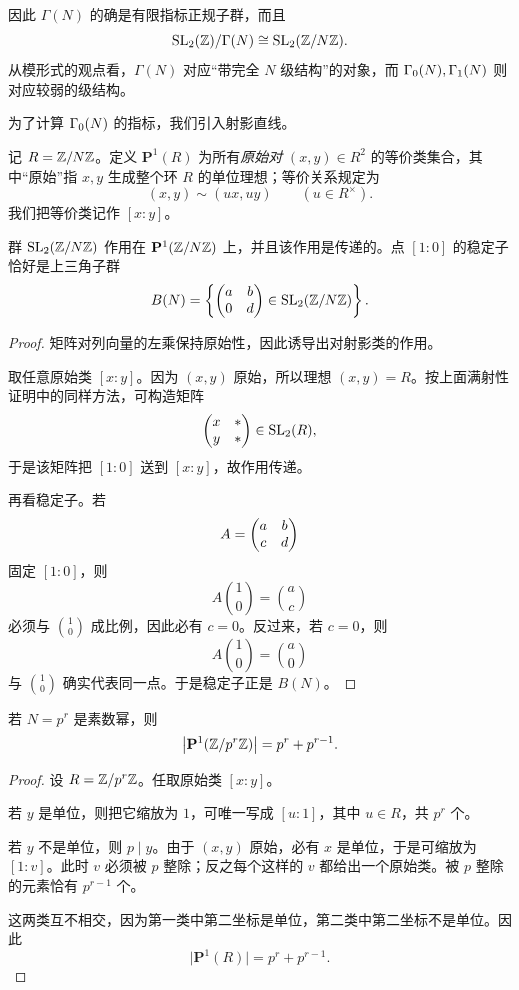 \begin{remark}
因此 $\Gamma(N)$ 的确是有限指标正规子群，而且
\[
\mathrm{SL}_2(\mathbb{Z})/\Gamma(N)\cong \mathrm{SL}_2(\mathbb{Z}/N\mathbb{Z}).
\]
从模形式的观点看，$\Gamma(N)$ 对应“带完全 $N$ 级结构”的对象，而 $\Gamma_0(N),\Gamma_1(N)$ 则对应较弱的级结构。
\end{remark}

为了计算 $\Gamma_0(N)$ 的指标，我们引入射影直线。

\begin{definition}
记 $R=\mathbb{Z}/N\mathbb{Z}$。定义 $\mathbf{P}^1(R)$ 为所有\emph{原始对} $(x,y)\in R^2$ 的等价类集合，其中“原始”指 $x,y$ 生成整个环 $R$ 的单位理想；等价关系规定为
\[
(x,y)\sim (ux,uy)\qquad (u\in R^\times).
\]
我们把等价类记作 $[x:y]$。
\end{definition}

\begin{proposition}
群 $\mathrm{SL}_2(\mathbb{Z}/N\mathbb{Z})$ 作用在 $\mathbf{P}^1(\mathbb{Z}/N\mathbb{Z})$ 上，并且该作用是传递的。点 $[1:0]$ 的稳定子恰好是上三角子群
\[
B(N)=\left\{\begin{pmatrix} a&b\\ 0&d \end{pmatrix}\in \mathrm{SL}_2(\mathbb{Z}/N\mathbb{Z})\right\}.
\]
\end{proposition}

\begin{proof}
矩阵对列向量的左乘保持原始性，因此诱导出对射影类的作用。

取任意原始类 $[x:y]$。因为 $(x,y)$ 原始，所以理想 $(x,y)=R$。按上面满射性证明中的同样方法，可构造矩阵
\[
\begin{pmatrix} x&*\\ y&* \end{pmatrix}\in \mathrm{SL}_2(R),
\]
于是该矩阵把 $[1:0]$ 送到 $[x:y]$，故作用传递。

再看稳定子。若
\[
A=\begin{pmatrix} a&b\\ c&d \end{pmatrix}
\]
固定 $[1:0]$，则
\[
A\binom{1}{0}=\binom{a}{c}
\]
必须与 $\binom{1}{0}$ 成比例，因此必有 $c=0$。反过来，若 $c=0$，则
\[
A\binom{1}{0}=\binom{a}{0}
\]
与 $\binom{1}{0}$ 确实代表同一点。于是稳定子正是 $B(N)$。
\end{proof}

\begin{lemma}
若 $N=p^r$ 是素数幂，则
\[
\bigl|\mathbf{P}^1(\mathbb{Z}/p^r\mathbb{Z})\bigr|=p^r+p^{r-1}.
\]
\end{lemma}

\begin{proof}
设 $R=\mathbb{Z}/p^r\mathbb{Z}$。任取原始类 $[x:y]$。

若 $y$ 是单位，则把它缩放为 $1$，可唯一写成 $[u:1]$，其中 $u\in R$，共 $p^r$ 个。

若 $y$ 不是单位，则 $p\mid y$。由于 $(x,y)$ 原始，必有 $x$ 是单位，于是可缩放为 $[1:v]$。此时 $v$ 必须被 $p$ 整除；反之每个这样的 $v$ 都给出一个原始类。被 $p$ 整除的元素恰有 $p^{r-1}$ 个。

这两类互不相交，因为第一类中第二坐标是单位，第二类中第二坐标不是单位。因此
\[
\bigl|\mathbf{P}^1(R)\bigr|=p^r+p^{r-1}.
\]
\end{proof}

